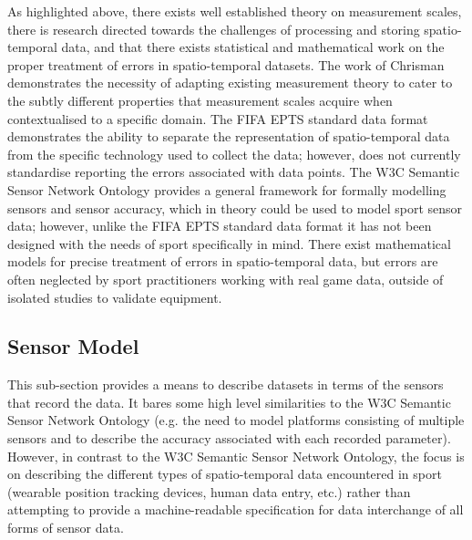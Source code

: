 
As highlighted above, there exists well established theory on measurement
scales, there is research directed towards the challenges of
processing and storing spatio-temporal data, and that there exists
statistical and mathematical work on the proper treatment of errors in
spatio-temporal datasets. The work of Chrisman
\cite{chrisman1998rethinking} demonstrates the necessity of adapting existing
measurement theory to cater to the subtly different properties that
measurement scales acquire when contextualised to a specific domain. The FIFA EPTS standard data format demonstrates the ability to separate the representation of spatio-temporal data from the specific technology used to collect the data; however, does not currently standardise reporting the errors associated with data points. The W3C Semantic Sensor Network Ontology provides a general framework for formally modelling sensors and sensor accuracy, which in theory could be used to model sport sensor data; however, unlike the FIFA EPTS standard data format it has not been designed with the needs of sport specifically in mind. There exist mathematical models for precise treatment of errors in spatio-temporal data, but errors are often neglected by sport practitioners working with real game
data, outside of isolated studies to validate equipment.




\subsection{Sensor Model}\label{our-model}

This sub-section provides a means to describe datasets in terms of the sensors that record the data. It bares some high level similarities to the W3C Semantic Sensor Network Ontology (e.g. the need to model platforms consisting of multiple sensors and to describe the accuracy associated with each recorded parameter). However, in contrast to the W3C Semantic Sensor Network Ontology, the focus is on describing the different types of spatio-temporal data encountered in sport (wearable position tracking devices, human data entry, etc.) rather than attempting to provide a machine-readable specification for data interchange of all forms of sensor data.


